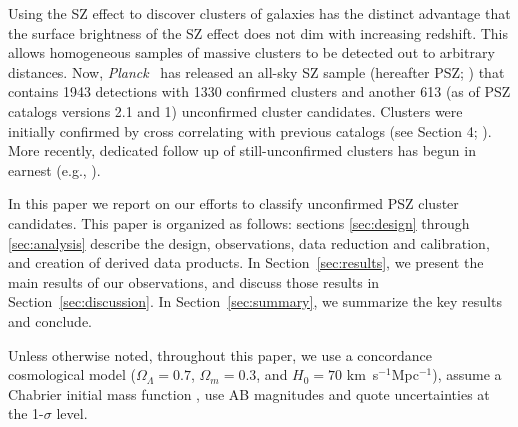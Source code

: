 \documentclass[apj, revtex4-1]{emulateapj}
\newcommand{\planck}{\textit{Planck}}
\newcommand{\kms}{\hbox{km~s$^{-1}$}}
\newcommand{\permpc}{\hbox{Mpc$^{-1}$}}
\newcommand{\eg}{e.g.}
\newcommand{\citeeg}[1]{(\eg, \citealt{#1})}
\begin{document}
Using the SZ effect to discover clusters of galaxies has the distinct advantage that the surface brightness of the SZ effect does not dim with increasing redshift. This allows homogeneous samples of massive clusters to be detected out to arbitrary distances. Now, \planck\ \citep{Tauber2010, PlanckCollaboration2011} has released an all-sky SZ sample (hereafter PSZ; \citealt{PlanckCollaboration2014, PlanckCollaboration2015a}) that contains 1943 detections with 1330 confirmed clusters and another 613 (as of PSZ catalogs versions 2.1 and 1) unconfirmed cluster candidates. Clusters were initially confirmed by cross correlating with previous catalogs (see Section 4; \citealt{PlanckCollaboration2014}). More recently, dedicated follow up of still-unconfirmed clusters has begun in earnest \citeeg{Liu2015a, PlanckCollaboration2015, PlanckCollaboration2016a, VanderBurg2016, Burenin2017, Barrena2018, Amodeo2018, Streblyanska2018}.

In this paper we report on our efforts to classify unconfirmed PSZ cluster candidates. This paper is organized as follows: sections \ref{sec:design} through \ref{sec:analysis} describe the design, observations, data reduction and calibration, and creation of derived data products. In Section~\ref{sec:results}, we present the main results of our observations, and discuss those results in Section~\ref{sec:discussion}. In Section~\ref{sec:summary}, we summarize the key results and conclude.

Unless otherwise noted, throughout this paper, we use a concordance cosmological model ($\Omega_\Lambda = 0.7$, $\Omega_m = 0.3$, and $H_0= 70$ \kms \permpc), assume a Chabrier initial mass function \citep{Chabrier2003}, use AB magnitudes \citep{Oke1974} and quote uncertainties at the 1-$\sigma$ level.
\end{document}

